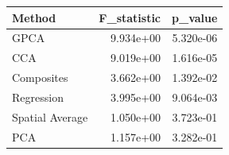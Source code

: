 \begin{tabular}{lrr}
\toprule
Method & F_statistic & p_value \\
\midrule
GPCA & 9.934e+00 & 5.320e-06 \\
CCA & 9.019e+00 & 1.616e-05 \\
Composites & 3.662e+00 & 1.392e-02 \\
Regression & 3.995e+00 & 9.064e-03 \\
Spatial Average & 1.050e+00 & 3.723e-01 \\
PCA & 1.157e+00 & 3.282e-01 \\
\bottomrule
\end{tabular}
